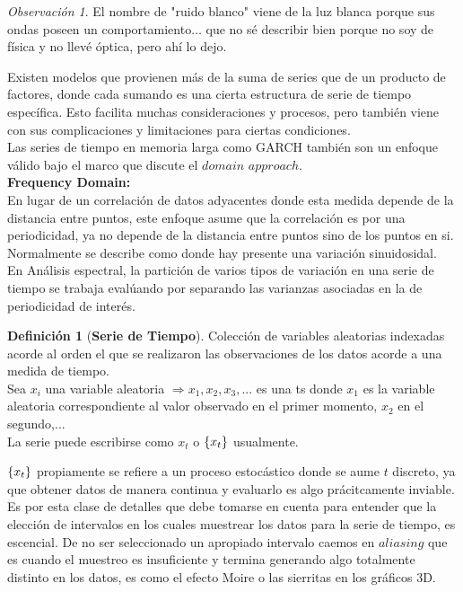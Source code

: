 \documentclass[11pt,a4paper,oneside]{report}
\theoremstyle{definition}
\newtheorem{definicion}{Definición}[chapter]
\theoremstyle{plain}
\theoremstyle{remark}
\newtheorem*{observacion}{Observación}
\DeclarePairedDelimiter{\conj}{\{}{\}}
\newcommand{\termino}[1]{\textbf{#1}\index{#1}}
\begin{document}
\begin{observacion}
  El nombre de "ruido blanco" viene de la luz blanca porque sus ondas poseen un comportamiento$\dots$
  que no sé describir bien porque no soy de física y no llevé óptica, pero ahí lo dejo.
\end{observacion}

Existen modelos que provienen más de la suma de series que de un producto de factores, donde 
cada sumando es una cierta estructura de serie de tiempo específica. Esto facilita muchas 
consideraciones y procesos, pero también viene con sus complicaciones y limitaciones para ciertas
condiciones.\\
Las series de tiempo en memoria larga como GARCH también son un enfoque válido bajo el marco que 
discute el $domain$ $approach$.\\

\textbf{Frequency Domain:}\\
En lugar de un correlación de datos adyacentes donde esta medida depende de la distancia entre
puntos, este enfoque asume que la correlación es por una periodicidad, ya no depende de la 
distancia entre puntos sino de los puntos en si. Normalmente se describe como donde hay presente
una variación sinuidosidal.\\
En Análisis espectral, la partición de varios tipos de variación en una serie de tiempo se 
trabaja evalúando por separando las varianzas asociadas en la de periodicidad de interés.\\

\begin{definicion}[\termino{Serie de Tiempo}]
  Colección de variables aleatorias indexadas acorde al orden el que se realizaron las observaciones
  de los datos acorde a una medida de tiempo.\\
  Sea $x_i$ una variable aleatoria $\Rightarrow x_1, x_2, x_3,...$ es una ts donde $x_1$ es la variable aleatoria 
  correspondiente al valor observado en el primer momento, $x_2$ en el segundo,$...$\\
  La serie puede escribirse como $x_t$ o $\conj{x_t}$ usualmente.
\end{definicion}

$\conj{x_t}$ propiamente se refiere a un proceso estocástico donde se aume $t$ discreto, ya que 
obtener datos de manera continua y evaluarlo es algo prácitcamente inviable. Es por esta clase de
detalles que debe tomarse en cuenta para entender que la elección de intervalos en los cuales muestrear
los datos para la serie de tiempo, es escencial. De no ser seleccionado un apropiado intervalo caemos en
$aliasing$ que es cuando el muestreo es insuficiente y termina generando algo totalmente distinto en los datos,
es como el efecto Moire o las sierritas en los gráficos 3D.
\end{document}

